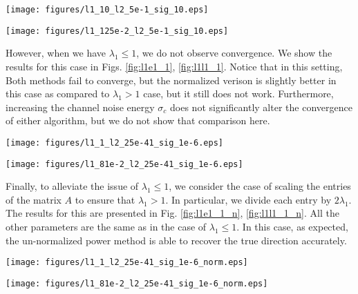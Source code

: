 \documentclass[10pt]{article}
\begin{document}
\begin{minipage}[t]{.5\linewidth}
\centering
\texttt{[image: figures/l1\_10\_l2\_5e-1\_sig\_10.eps]}
\label{fig:l1g1_1}
\end{minipage}%
\begin{minipage}[t]{.5\linewidth}
\centering
\texttt{[image: figures/l1\_125e-2\_l2\_5e-1\_sig\_10.eps]}
\label{fig:l1g1_2}
\end{minipage}

However, when we have $\lambda_1 \leq 1$, we do not observe convergence. We show the results for this case in Figs. \ref{fig:l1e1_1}, \ref{fig:l1l1_1}. Notice that in this setting, Both methods fail to converge, but the normalized verison is slightly better in this case as compared to $\lambda_1 > 1$ case, but it still does not work. Furthermore, increasing the channel noise energy $\sigma_c$ does not significantly alter the convergence of either algorithm, but we do not show that comparison here. 

\begin{minipage}[t]{.5\linewidth}
\centering
\texttt{[image: figures/l1\_1\_l2\_25e-41\_sig\_1e-6.eps]}
\label{fig:l1e1_1}
\end{minipage}%
\begin{minipage}[t]{.5\linewidth}
\centering
\texttt{[image: figures/l1\_81e-2\_l2\_25e-41\_sig\_1e-6.eps]}
\label{fig:l1l1_1}
\end{minipage}

Finally, to alleviate the issue of $\lambda_1 \leq 1$, we consider the case of scaling the entries of the matrix $A$ to ensure that $\lambda_1 > 1$. In particular, we divide each entry by $2\lambda_1$. The results for this are presented in Fig. \ref{fig:l1e1_1_n}, \ref{fig:l1l1_1_n}. All the other parameters are the same as in the case of $\lambda_1 \leq 1$. In this case, as expected, the un-normalized power method is able to recover the true direction accurately. 

\begin{minipage}[t]{.5\linewidth}
\centering
\texttt{[image: figures/l1\_1\_l2\_25e-41\_sig\_1e-6\_norm.eps]}
\label{fig:l1e1_1_n}
\end{minipage}%
\begin{minipage}[t]{.5\linewidth}
\centering
\texttt{[image: figures/l1\_81e-2\_l2\_25e-41\_sig\_1e-6\_norm.eps]}
\label{fig:l1l1_1_n}
\end{minipage}
\end{document}

